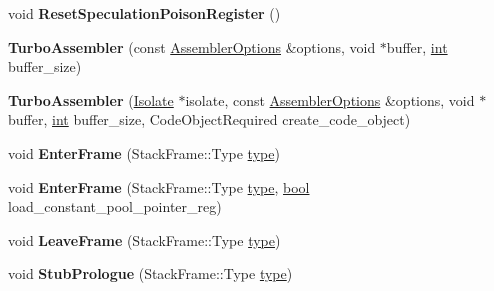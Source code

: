 \begin{DoxyCompactItemize}
void {\bfseries Reset\+Speculation\+Poison\+Register} ()
\item 
\mbox{\label{classv8_1_1internal_1_1TurboAssembler_ac5a1cdee47961f289dbb095cc534ef95}} 
{\bfseries Turbo\+Assembler} (const \mbox{\hyperlink{structv8_1_1internal_1_1AssemblerOptions}{Assembler\+Options}} \&options, void $\ast$buffer, \mbox{\hyperlink{classint}{int}} buffer\+\_\+size)
\item 
\mbox{\label{classv8_1_1internal_1_1TurboAssembler_ac5d3c303e7abed78a6c1fe7f9834c045}} 
{\bfseries Turbo\+Assembler} (\mbox{\hyperlink{classv8_1_1internal_1_1Isolate}{Isolate}} $\ast$isolate, const \mbox{\hyperlink{structv8_1_1internal_1_1AssemblerOptions}{Assembler\+Options}} \&options, void $\ast$buffer, \mbox{\hyperlink{classint}{int}} buffer\+\_\+size, Code\+Object\+Required create\+\_\+code\+\_\+object)
\item 
\mbox{\label{classv8_1_1internal_1_1TurboAssembler_a4aea206c1c673c33c7ef241e8bca04ea}} 
void {\bfseries Enter\+Frame} (Stack\+Frame\+::\+Type \mbox{\hyperlink{classstd_1_1conditional_1_1type}{type}})
\item 
\mbox{\label{classv8_1_1internal_1_1TurboAssembler_af705c58e218094857590d07367afb65f}} 
void {\bfseries Enter\+Frame} (Stack\+Frame\+::\+Type \mbox{\hyperlink{classstd_1_1conditional_1_1type}{type}}, \mbox{\hyperlink{classbool}{bool}} load\+\_\+constant\+\_\+pool\+\_\+pointer\+\_\+reg)
\item 
\mbox{\label{classv8_1_1internal_1_1TurboAssembler_a6fcf697a920fa427114a1923f03da4d8}} 
void {\bfseries Leave\+Frame} (Stack\+Frame\+::\+Type \mbox{\hyperlink{classstd_1_1conditional_1_1type}{type}})
\item 
\mbox{\label{classv8_1_1internal_1_1TurboAssembler_a2398db9e10af1223aee6d3d491de79e6}} 
void {\bfseries Stub\+Prologue} (Stack\+Frame\+::\+Type \mbox{\hyperlink{classstd_1_1conditional_1_1type}{type}})
\item 
\mbox{\label{classv8_1_1internal_1_1TurboAssembler_aebd70343720df393021ce72e183385b3}} 

\end{DoxyCompactItemize}

